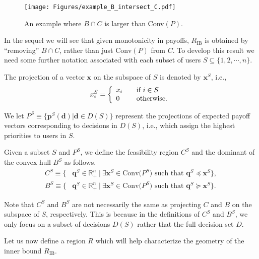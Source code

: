 \documentclass[prodmode,acmtompecs]{acmsmall}
\newcommand{\reqvec}{\mathbf{q}}
\newcommand{\concaveHull}{R}
\newcommand{\myComments}[1]{}
\newif\ifdissertation
\newcommand{\dissertationStart}{\ifdissertation  \myComments{Dissertation version: }}
\newcommand{\commentEnd}{\myComments{End}}
\begin{document}
\begin{figure}[htp]
  \centering
  \texttt{[image: Figures/example\_B\_intersect\_C.pdf]}
  \caption{An example where $B\cap C$ is larger than Conv$(P)$. }
  \label{fig_eg_for_B_intersect_C}
\end{figure} 

In the sequel we will see that given monotonicity in payoffs, $R_{\text{IB}}$ is obtained by ``removing'' $B \cap C$, rather than just $\text{Conv}(P)$ from $C$. 
To develop this result we need some further notation associated with each subset of users $S\subseteq \{1, 2, \cdots, n\}$. 

The projection of a vector $\mathbf{x}$ on the subspace of $S$ is denoted by $\mathbf{x}^S$, i.e., 
$$
x_i^S = \left\{ 
   \begin{array}{l l}
     x_i & \quad \text{if $i \in S$}	\\
     0 & \quad \text{otherwise}.	\\
   \end{array} \right.
$$



We let $P^S \equiv \{\mathbf{p}^S(\mathbf{d}) | \mathbf{d} \in D(S)\}$ represent the projections of expected payoff vectors corresponding to decisions in $D(S)$, i.e., which assign the highest priorities to users in $S$. 

Given a subset $S$ and $P^S$, we define the feasibility region $C^S$ and the dominant of the convex hull $B^S$ as follows. 
\begin{align*}
C^S \equiv \{& \reqvec^S \in \mathbb R^n_+ ~|~ \exists \mathbf{x}^S \in \text{Conv($P^S$)} \text{ such that } \reqvec^S \preceq \mathbf{x}^S \}, 	\\
B^S \equiv \{& \reqvec^S \in \mathbb R^n_+ ~|~ \exists \mathbf{x}^S \in \text{Conv($P^S$)} \text{ such that } \reqvec^S \succeq \mathbf{x}^S \}. 
\end{align*}


Note that $C^S$ and $B^S$ are not necessarily the same as projecting $C$ and $B$ on the subspace of $S$, respectively. This is because in the definitions of $C^S$ and $B^S$, 
we only focus on a subset of decisions $D(S)$ rather that the full decision set $D$. 
\dissertationStart
we only focus on priority decisions $\mathbf{d} \in D(S)$ rather that the full decision set $D$. 
\commentEnd\fi

Let us now define a region $\concaveHull$ which will help characterize the geometry of the inner bound $R_{\text{IB}}$. 
\end{document}
